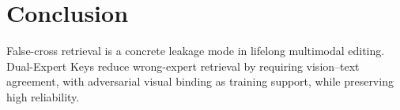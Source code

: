 \documentclass[letterpaper]{article} %
\begin{document}
\section{Conclusion}
False-cross retrieval is a concrete leakage mode in lifelong multimodal editing.
Dual-Expert Keys reduce wrong-expert retrieval by requiring vision--text agreement, with adversarial visual binding as training support, while preserving high reliability.



\end{document}
